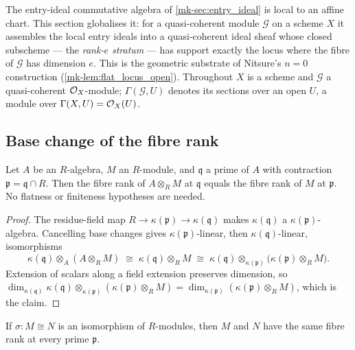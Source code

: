 The entry-ideal commutative algebra of \ref{mk-sec:entry_ideal} is local to an
affine chart.  This section globalises it: for a quasi-coherent module
\(\mathcal G\) on a scheme \(X\) it assembles the local entry ideals into a
quasi-coherent ideal sheaf whose closed subscheme --- the \emph{rank-\(e\)
stratum} --- has support exactly the locus where the fibre of \(\mathcal G\)
has dimension \(e\).  This is the geometric substrate of Nitsure's
\(n = 0\) construction (\ref{mk-lem:flat_locus_open}).  Throughout \(X\) is a
scheme and \(\mathcal G\) a quasi-coherent \(\mathcal{O}_X\)-module; \(\Gamma(\mathcal G, U)\)
denotes its sections over an open \(U\), a module over \(\Gamma(X, U) = \mathcal{O}_X(U)\).

\subsection{Base change of the fibre rank}

\begin{theorem}
  \label{mk-thm:fiber_rank_base_change}
  \leanok

  Let \(A\) be an \(R\)-algebra, \(M\) an \(R\)-module, and \(\mathfrak q\) a
  prime of \(A\) with contraction \(\mathfrak p = \mathfrak q \cap R\).  Then
  the fibre rank of \(A \otimes_R M\) at \(\mathfrak q\) equals the fibre rank
  of \(M\) at \(\mathfrak p\).  No flatness or finiteness hypotheses are
  needed.
\end{theorem}

\begin{proof}
  \leanok
  The residue-field map \(R \to \kappa(\mathfrak p) \to \kappa(\mathfrak q)\)
  makes \(\kappa(\mathfrak q)\) a \(\kappa(\mathfrak p)\)-algebra.  Cancelling
  base changes gives \(\kappa(\mathfrak p)\)-linear, then
  \(\kappa(\mathfrak q)\)-linear, isomorphisms
  \[
    \kappa(\mathfrak q) \otimes_A (A \otimes_R M)
      \;\cong\; \kappa(\mathfrak q) \otimes_R M
      \;\cong\; \kappa(\mathfrak q) \otimes_{\kappa(\mathfrak p)}
        \bigl(\kappa(\mathfrak p) \otimes_R M\bigr).
  \]
  Extension of scalars along a field extension preserves dimension, so
  \(\dim_{\kappa(\mathfrak q)}
    \kappa(\mathfrak q) \otimes_{\kappa(\mathfrak p)}
    (\kappa(\mathfrak p) \otimes_R M)
    = \dim_{\kappa(\mathfrak p)}(\kappa(\mathfrak p) \otimes_R M)\),
  which is the claim.
\end{proof}

\begin{lemma}
  \label{mk-lem:fiber_rank_congr}
  \leanok

  If \(\sigma : M \cong N\) is an isomorphism of \(R\)-modules, then \(M\) and
  \(N\) have the same fibre rank at every prime \(\mathfrak p\).
\end{lemma}

